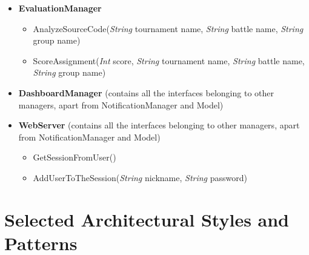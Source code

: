\begin{itemize}
    \item \textbf{\textbf{EvaluationManager}}

\begin{itemize}
        \item AnalyzeSourceCode(\textit{String} tournament name, \textit{String} battle name, \textit{String} group name)
        \item ScoreAssignment(\textit{Int}  score, \textit{String} tournament name, \textit{String} battle name, \textit{String} group name)
\end{itemize}

    \item \textbf{\textbf{DashboardManager}} (contains all the interfaces belonging to other managers, apart from NotificationManager and Model)

    \item \textbf{\textbf{WebServer}} (contains all the interfaces belonging to other managers, apart from NotificationManager and Model)
    \begin{itemize}
        \item GetSessionFromUser()
        \item AddUserToTheSession(\textit{String} nickname, \textit{String} password)
\end{itemize}

\end{itemize}


\section{Selected Architectural Styles and Patterns}
\label{sec:selected_Srchitectural_styles_patterns}%

